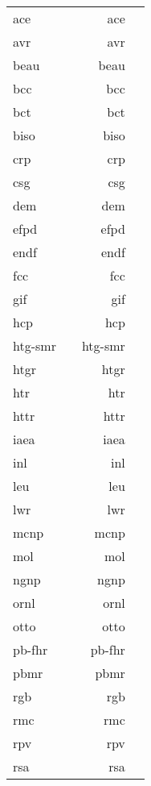 \begin{longtable}{p{25mm} p{50mm} rp{75mm}}
\acrshort{ace} & & \acrlong{ace} \\
\acrshort{avr} & & \acrlong{avr} \\
\acrshort{beau} & & \acrlong{beau} \\
\acrshort{bcc} & & \acrlong{bcc} \\
\acrshort{bct} & & \acrlong{bct} \\
\acrshort{biso} & & \acrlong{biso} \\
\acrshort{crp} & & \acrlong{crp} \\
\acrshort{csg} & & \acrlong{csg} \\
\acrshort{dem} & & \acrlong{dem} \\
\acrshort{efpd} & & \acrlong{efpd} \\
\acrshort{endf} & & \acrlong{endf} \\
\acrshort{fcc} & & \acrlong{fcc} \\
\acrshort{gif} & & \acrlong{gif} \\
\acrshort{hcp} & & \acrlong{hcp} \\
\acrshort{htg-smr} & & \acrlong{htg-smr} \\
\acrshort{htgr} & & \acrlong{htgr} \\
\acrshort{htr} & & \acrlong{htr} \\
\acrshort{httr} & & \acrlong{httr} \\
\acrshort{iaea} & & \acrlong{iaea} \\
\acrshort{inl} & & \acrlong{inl} \\
\acrshort{leu} & & \acrlong{leu} \\
\acrshort{lwr} & & \acrlong{lwr} \\
\acrshort{mcnp} & & \acrlong{mcnp} \\
\acrshort{mol} & & \acrlong{mol} \\
\acrshort{ngnp} & & \acrlong{ngnp} \\
\acrshort{ornl} & & \acrlong{ornl} \\
\acrshort{otto} & & \acrlong{otto} \\
\acrshort{pb-fhr} & & \acrlong{pb-fhr} \\
\acrshort{pbmr} & & \acrlong{pbmr} \\
\acrshort{rgb} & & \acrlong{rgb} \\
\acrshort{rmc} & & \acrlong{rmc} \\
\acrshort{rpv} & & \acrlong{rpv} \\
\acrshort{rsa} & & \acrlong{rsa} \\

\end{longtable}
